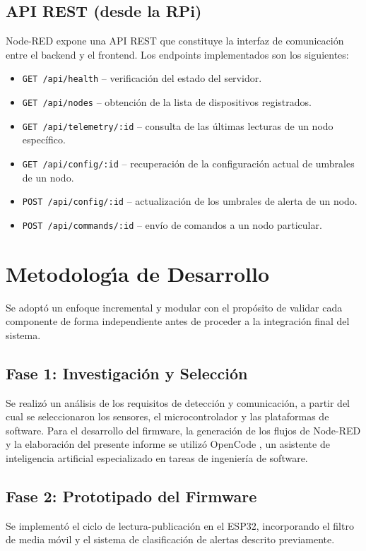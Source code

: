 \documentclass[11pt,a4paper]{article}
\begin{document}
\subsection{API REST (desde la RPi)}
Node-RED expone una API REST que constituye la interfaz de comunicaci\'on entre el backend y el frontend. Los endpoints implementados son los siguientes:
\begin{itemize}
    \item \texttt{GET /api/health} -- verificaci\'on del estado del servidor.
    \item \texttt{GET /api/nodes} -- obtenci\'on de la lista de dispositivos registrados.
    \item \texttt{GET /api/telemetry/:id} -- consulta de las \'ultimas lecturas de un nodo espec\'ifico.
    \item \texttt{GET /api/config/:id} -- recuperaci\'on de la configuraci\'on actual de umbrales de un nodo.
    \item \texttt{POST /api/config/:id} -- actualizaci\'on de los umbrales de alerta de un nodo.
    \item \texttt{POST /api/commands/:id} -- env\'io de comandos a un nodo particular.
\end{itemize}

\section{Metodolog\'\i{}a de Desarrollo}
Se adopt\'o un enfoque incremental y modular con el prop\'osito de validar cada componente de forma independiente antes de proceder a la integraci\'on final del sistema.

\subsection{Fase 1: Investigaci\'on y Selecci\'on}
Se realiz\'o un an\'alisis de los requisitos de detecci\'on y comunicaci\'on, a partir del cual se seleccionaron los sensores, el microcontrolador y las plataformas de software. Para el desarrollo del firmware, la generaci\'on de los flujos de Node-RED y la elaboraci\'on del presente informe se utiliz\'o OpenCode \citep{opencode2025}, un asistente de inteligencia artificial especializado en tareas de ingenier\'ia de software.

\subsection{Fase 2: Prototipado del Firmware}
Se implement\'o el ciclo de lectura-publicaci\'on en el ESP32, incorporando el filtro de media m\'ovil y el sistema de clasificaci\'on de alertas descrito previamente.
\end{document}
